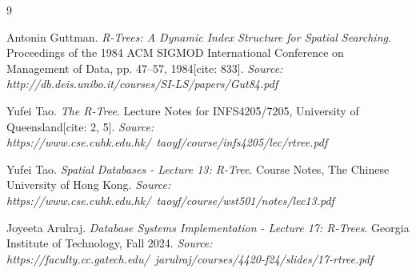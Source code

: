 \documentclass[a4paper, 10pt, titlepage]{report}
\begin{document}
\begin{thebibliography}{9}

Antonin Guttman. 
\textit{R-Trees: A Dynamic Index Structure for Spatial Searching}. 
Proceedings of the 1984 ACM SIGMOD International Conference on Management of Data, pp. 47–57, 1984[cite: 833].
\textit{Source: http://db.deis.unibo.it/courses/SI-LS/papers/Gut84.pdf}

Yufei Tao. 
\textit{The R-Tree}. 
Lecture Notes for INFS4205/7205, University of Queensland[cite: 2, 5].
\textit{Source: https://www.cse.cuhk.edu.hk/~taoyf/course/infs4205/lec/rtree.pdf}

Yufei Tao. 
\textit{Spatial Databases - Lecture 13: R-Tree}. 
Course Notes, The Chinese University of Hong Kong.
\textit{Source: https://www.cse.cuhk.edu.hk/~taoyf/course/wst501/notes/lec13.pdf}

Joyeeta Arulraj. 
\textit{Database Systems Implementation - Lecture 17: R-Trees}. 
Georgia Institute of Technology, Fall 2024.
\textit{Source: https://faculty.cc.gatech.edu/~jarulraj/courses/4420-f24/slides/17-rtree.pdf}

\end{thebibliography}
\end{document}
